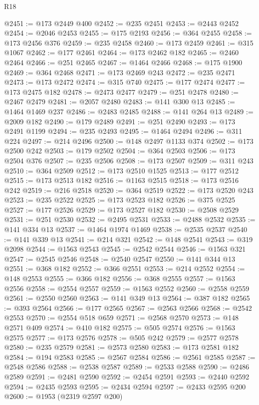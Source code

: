 \begin{lexlean}{R18}
\begin{coremodule}
@2451 := @173 @2449 @400
@2452 := @235 @2451
@2453 := @2443 @2452
@2454 := @2046 @2453
@2455 := @175 @2193
@2456 := @364 @2455
@2458 := @173 @2456 @376
@2459 := @235 @2458
@2460 := @173 @2459
@2461 := @315 @1067
@2462 := @177 @2461
@2464 := @173 @2462 @182
@2465 := @2460 @2464
@2466 := @251 @2465
@2467 := @1464 @2466
@2468 := @175 @1900
@2469 := @364 @2468
@2471 := @173 @2469 @243
@2472 := @235 @2471
@2473 := @173 @2472
@2474 := @315 @740
@2475 := @177 @2474
@2477 := @173 @2475 @182
@2478 := @2473 @2477
@2479 := @251 @2478
@2480 := @2467 @2479
@2481 := @2057 @2480
@2483 := @141 @300 @13
@2485 := @1464 @1469 @237
@2486 := @2483 @2485
@2488 := @141 @264 @13
@2489 := @2009 @182
@2490 := @179 @2489
@2491 := @251 @2490
@2493 := @173 @2491 @1199
@2494 := @235 @2493
@2495 := @1464 @2494
@2496 := @311 @224
@2497 := @214 @2496
@2500 := @148 @2497 @1133 @374
@2502 := @173 @2500 @242
@2503 := @179 @2502
@2504 := @364 @2503
@2506 := @173 @2504 @376
@2507 := @235 @2506
@2508 := @173 @2507
@2509 := @311 @243
@2510 := @364 @2509
@2512 := @173 @2510 @1525
@2513 := @177 @2512
@2515 := @173 @2513 @182
@2516 := @1163 @2515
@2518 := @173 @2516 @242
@2519 := @216 @2518
@2520 := @364 @2519
@2522 := @173 @2520 @243
@2523 := @235 @2522
@2525 := @173 @2523 @182
@2526 := @375 @2525
@2527 := @177 @2526
@2529 := @173 @2527 @182
@2530 := @2508 @2529
@2531 := @251 @2530
@2532 := @2495 @2531
@2533 := @2488 @2532
@2535 := @141 @334 @13
@2537 := @1464 @1974 @1469
@2538 := @2535 @2537
@2540 := @141 @339 @13
@2541 := @214 @321
@2542 := @148 @2541
@2543 := @319 @2098
@2544 := @1563 @2543
@2545 := @2542 @2544
@2546 := @1563 @321
@2547 := @2545 @2546
@2548 := @2540 @2547
@2550 := @141 @344 @13
@2551 := @368 @182
@2552 := @366 @2551
@2553 := @214 @2552
@2554 := @148 @2553
@2555 := @366 @182
@2556 := @368 @2555
@2557 := @1563 @2556
@2558 := @2554 @2557
@2559 := @1563 @2552
@2560 := @2558 @2559
@2561 := @2550 @2560
@2563 := @141 @349 @13
@2564 := @387 @182
@2565 := @393 @2564
@2566 := @177 @2565
@2567 := @2563 @2566
@2568 := @2542 @2553
@2570 := @2554 @518 @659
@2571 := @2568 @2570
@2573 := @148 @2571 @409
@2574 := @410 @182
@2575 := @505 @2574
@2576 := @1563 @2575
@2577 := @173 @2576
@2578 := @505 @242
@2579 := @2577 @2578
@2580 := @235 @2579
@2581 := @2573 @2580
@2583 := @173 @2581 @182
@2584 := @194 @2583
@2585 := @2567 @2584
@2586 := @2561 @2585
@2587 := @2548 @2586
@2588 := @2538 @2587
@2589 := @2533 @2588
@2590 := @2486 @2589
@2591 := @2481 @2590
@2592 := @2454 @2591
@2593 := @2440 @2592
@2594 := @2435 @2593
@2595 := @2434 @2594
@2597 := @2433 @2595 @200
@2600 := @1953 (@2319 @2597 @200)

\end{coremodule}
\end{lexlean}
